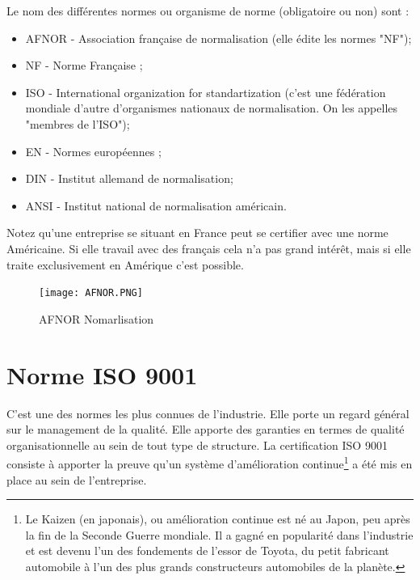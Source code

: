\documentclass[
	11pt, %
	fleqn, %
	a4paper, %
]{LegrandOrangeBook}
\begin{document}
\begin{theorem}
    Le nom des différentes normes ou organisme de norme (obligatoire ou non) sont :
    \begin{itemize}
    \item AFNOR - Association française de normalisation (elle édite les normes "NF");
        \item NF - Norme Française ;
        \item ISO - International organization for standartization (c'est une fédération mondiale d'autre d'organismes nationaux de normalisation. On les appelles "membres de l'ISO");
        \item EN - Normes européennes ;
        \item DIN - Institut allemand de normalisation;
        \item ANSI -  Institut national de normalisation américain.
    \end{itemize}
\end{theorem}

\begin{remark}
Notez qu'une entreprise se situant en France peut se certifier avec une norme Américaine. Si elle travail avec des français cela n'a pas grand intérêt, mais si elle traite exclusivement en Amérique c'est possible.
\end{remark}


\begin{figure}[H] %
	\centering %
	\texttt{[image: AFNOR.PNG]} %
	\caption{AFNOR Nomarlisation}
	\label{AFNOR} %
\end{figure}



\section{Norme ISO 9001}


C’est une des normes les plus connues de l’industrie. Elle porte un regard général sur le management de la qualité. Elle apporte des garanties en termes de qualité organisationnelle au sein de tout type de structure. La certification ISO 9001 consiste à apporter la preuve qu'un système d'amélioration continue\footnote{Le Kaizen (en japonais), ou amélioration continue est né au Japon, peu après la fin de la Seconde Guerre mondiale. Il a gagné en popularité dans l’industrie et est devenu l’un des fondements de l’essor de Toyota, du petit fabricant automobile à l’un des plus grands constructeurs automobiles de la planète.} a été mis en place au sein de l'entreprise.\\
\end{document}
